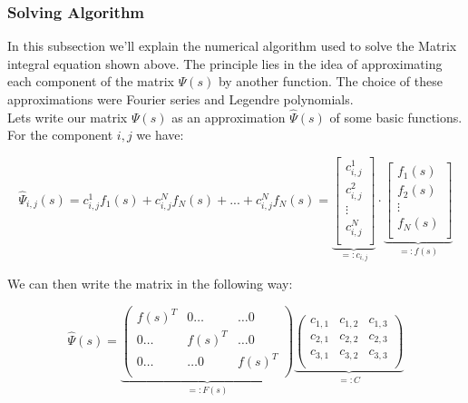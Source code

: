 \subsubsection{Solving Algorithm}

In this subsection we'll explain the numerical algorithm used to solve the Matrix integral equation shown above. The principle lies in the idea of approximating each component of the matrix $\Psi(s)$ by another function. The choice of these approximations were Fourier series and Legendre polynomials.\\

Lets write our matrix $\Psi(s)$ as an approximation $\hat{\Psi}(s)$ of some basic functions. For the component $i,j$ we have:

\begin{subequations}
\begin{equation}
\hat{\Psi}_{i,j}(s)  = c_{i,j}^1f_1(s) + c_{i,j}^Nf_N(s) + ... + c_{i,j}^Nf_N(s) = 
\end{equation}
\begin{equation}
\underbrace{ \left[ 
\begin{array} {c}
c_{i,j}^1 \\
c_{i,j}^2 \\
\vdots \\
c_{i,j}^N \\
\end{array}\right]}_{=:c_{i,j}} \cdot \underbrace{\left[ 
\begin{array} {c}
f_1(s) \\
f_2(s) \\
\vdots \\
f_N(s) \\
\end{array}\right]}_{=:f(s)}
\end{equation}
\end{subequations}

We can then write the matrix in the following way:

\begin{equation}
\hat{\Psi}(s) = \underbrace{ \left(\begin{array}{ccc}
f(s)^T & 0 \dots &  \dots 0 \\
0 \dots & f(s)^T & \dots 0 \\
0 \dots & \dots 0 & f(s)^T\\
\end{array} \right)}_{=:F(s)}\underbrace{ \left(\begin{array}{ccc}
c_{1,1} & c_{1,2} & c_{1,3}   \\
c_{2,1} & c_{2,2} & c_{2,3}   \\
c_{3,1} & c_{3,2} & c_{3,3}   \\
\end{array} \right)}_{=:C}
\end{equation}

